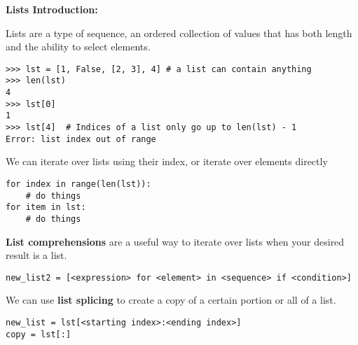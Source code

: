 \textbf{Lists Introduction:}

Lists are a type of sequence, an ordered collection of values that has both length and the ability to select elements.

\begin{lstlisting}
>>> lst = [1, False, [2, 3], 4] # a list can contain anything
>>> len(lst)
4
>>> lst[0]
1
>>> lst[4] 	# Indices of a list only go up to len(lst) - 1
Error: list index out of range
\end{lstlisting}

We can iterate over lists using their index, or iterate over elements directly

\begin{lstlisting}
for index in range(len(lst)):
	# do things
for item in lst:
	# do things
\end{lstlisting}

\textbf{List comprehensions} are a useful way to iterate over lists when your desired result is a list.
\begin{lstlisting}
new_list2 = [<expression> for <element> in <sequence> if <condition>]
\end{lstlisting}

We can use \textbf{list splicing} to create a copy of a certain portion or all of a list.

\begin{lstlisting}
new_list = lst[<starting index>:<ending index>]
copy = lst[:]
\end{lstlisting}

